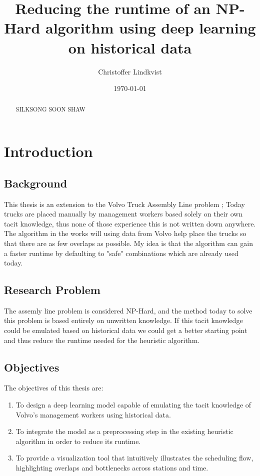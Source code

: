 \documentclass[12pt,a4paper]{report}
\begin{document}
\title{Reducing the runtime of an NP-Hard algorithm using deep learning on historical data}
\author{Christoffer Lindkvist}
\date{\today}
\maketitle

\begin{abstract}
    SILKSONG SOON SHAW 
\end{abstract}

\tableofcontents
\listoffigures

\chapter{Introduction}
\section{Background}
    This thesis is an extension to the Volvo Truck Assembly Line problem \cite{?}; 
    Today trucks are placed manually by management workers based solely on their own tacit knowledge, 
    thus none of those experience this is not written down anywhere. 
    The algorithm in the works will using data from Volvo help place the trucks so that there are as few overlaps as possible. 
    My idea is that the algorithm can gain a faster runtime by defaulting to "safe" combinations which are already used today.
    
\section{Research Problem}
The assemly line problem is considered NP-Hard, and the method today to solve this problem is based entirely on unwritten knowledge. If this tacit knowledge could be emulated based on historical data we could get a better starting point and thus reduce the runtime needed for the heuristic algorithm. 
\section{Objectives}
The objectives of this thesis are:
\begin{enumerate}
    \item To design a deep learning model capable of emulating the tacit knowledge of Volvo's management workers using historical data.
    \item To integrate the model as a preprocessing step in the existing heuristic algorithm in order to reduce its runtime.
    \item To provide a visualization tool that intuitively illustrates the scheduling flow, highlighting overlaps and bottlenecks across stations and time.
\end{enumerate}
\end{document}
